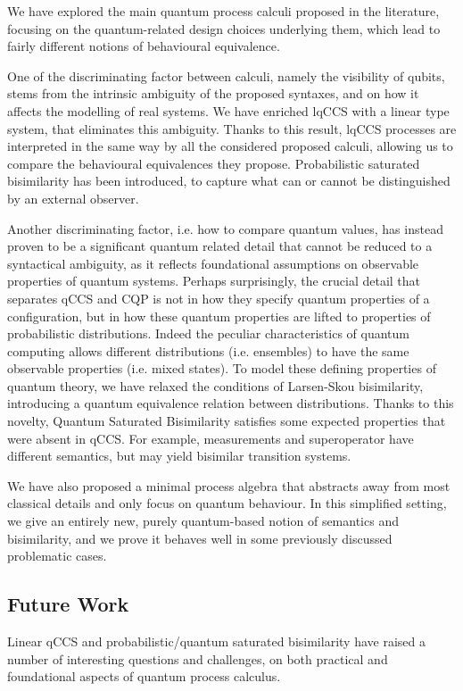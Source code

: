 We have explored the main  quantum process calculi proposed in the literature, focusing on the quantum-related design choices underlying them, which lead to fairly different notions of behavioural equivalence.

One of the discriminating factor between calculi, namely the visibility of qubits, stems from the intrinsic ambiguity of the proposed syntaxes, and on how it affects the modelling of real systems. We have enriched lqCCS with a linear type system, that eliminates this ambiguity. Thanks to this result, lqCCS processes are interpreted in the same way by all the considered proposed calculi, allowing us to compare the behavioural equivalences they propose. Probabilistic saturated bisimilarity has been introduced, to capture what can or cannot be distinguished by an external observer.

Another discriminating factor, i.e. how to compare quantum values, has instead proven to be a significant quantum related detail that cannot be reduced to a syntactical ambiguity, as it reflects foundational assumptions on observable properties of quantum systems. Perhaps surprisingly, the crucial detail that separates qCCS and CQP is not in how they specify quantum properties of a configuration, but in how these quantum properties are lifted to properties of probabilistic distributions. Indeed the peculiar characteristics of quantum computing allows different distributions (i.e. ensembles) to have the same observable properties (i.e. mixed states). To model these defining properties of quantum theory, we have relaxed the conditions of Larsen-Skou bisimilarity, introducing a quantum equivalence relation between distributions. Thanks to this novelty, Quantum Saturated Bisimilarity satisfies some expected properties that were absent in qCCS. For example, measurements and superoperator have different semantics, but may yield bisimilar transition systems. 

We have also proposed a minimal process algebra that abstracts away from most classical details and only focus on quantum behaviour. In this simplified setting, we give an entirely new, purely quantum-based notion of semantics and bisimilarity, and we prove it behaves well in some previously discussed problematic cases. 

\subsection*{Future Work}
Linear qCCS and probabilistic/quantum saturated bisimilarity have raised a number of interesting questions and challenges, on both practical and foundational aspects of quantum process calculus.

